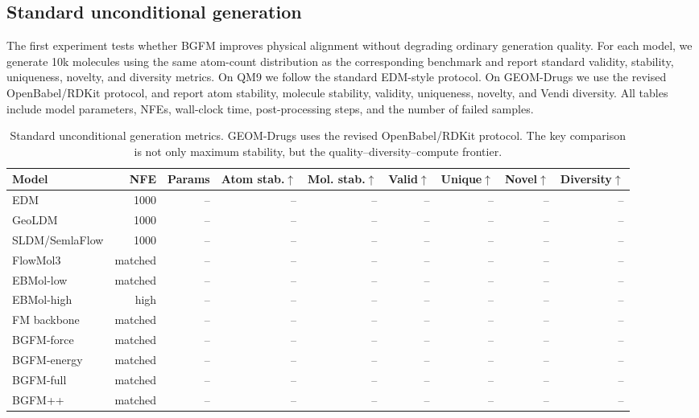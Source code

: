 \subsection{Standard unconditional generation}

The first experiment tests whether BGFM improves physical alignment without degrading ordinary generation quality. For each model, we generate 10k molecules using the same atom-count distribution as the corresponding benchmark and report standard validity, stability, uniqueness, novelty, and diversity metrics. On QM9 we follow the standard EDM-style protocol. On GEOM-Drugs we use the revised OpenBabel/RDKit protocol, and report atom stability, molecule stability, validity, uniqueness, novelty, and Vendi diversity. All tables include model parameters, NFEs, wall-clock time, post-processing steps, and the number of failed samples.

\begin{table}[t]
\centering
\small
\caption{Standard unconditional generation metrics. GEOM-Drugs uses the revised OpenBabel/RDKit protocol. The key comparison is not only maximum stability, but the quality--diversity--compute frontier.}
\label{tab:standard_generation}
\begin{tabular}{lrrrrrrrr}
\toprule
Model & NFE & Params & Atom stab.$\uparrow$ & Mol. stab.$\uparrow$ & Valid$\uparrow$ & Unique$\uparrow$ & Novel$\uparrow$ & Diversity$\uparrow$ \\
\midrule
EDM & 1000 & -- & -- & -- & -- & -- & -- & -- \\
GeoLDM & 1000 & -- & -- & -- & -- & -- & -- & -- \\
SLDM/SemlaFlow & 1000 & -- & -- & -- & -- & -- & -- & -- \\
FlowMol3 & matched & -- & -- & -- & -- & -- & -- & -- \\
EBMol-low & matched & -- & -- & -- & -- & -- & -- & -- \\
EBMol-high & high & -- & -- & -- & -- & -- & -- & -- \\
FM backbone & matched & -- & -- & -- & -- & -- & -- & -- \\
BGFM-force & matched & -- & -- & -- & -- & -- & -- & -- \\
BGFM-energy & matched & -- & -- & -- & -- & -- & -- & -- \\
BGFM-full & matched & -- & -- & -- & -- & -- & -- & -- \\
BGFM++ & matched & -- & -- & -- & -- & -- & -- & -- \\
\bottomrule
\end{tabular}
\end{table}

